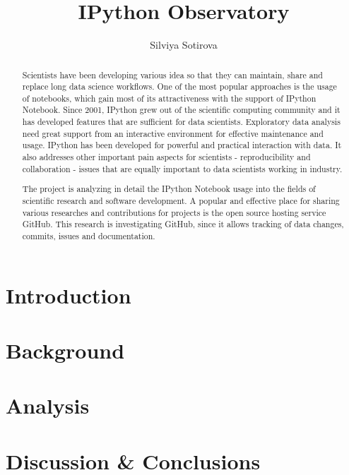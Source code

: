 \documentclass{mpaper}
\begin{document}
\title{IPython Observatory}
\author{Silviya Sotirova}

\maketitle

\begin{abstract}

Scientists have been developing various idea so that they can maintain, share and replace long data science workflows. One of the most popular approaches is the usage of notebooks, which gain most of its attractiveness with the support of IPython Notebook. Since 2001, IPython grew out of the scientific computing community and it has developed features that are sufficient for data scientists. Exploratory data analysis need great support from an interactive environment for effective maintenance and usage. IPython has been developed for powerful and practical interaction with data. It also addresses other important pain aspects for scientists - reproducibility and collaboration - issues that are equally important to data scientists working in industry.

The project is analyzing in detail the IPython Notebook usage into the fields of scientific research and software development. A popular and effective place for sharing various researches and contributions for projects is the open source hosting service GitHub. This research is investigating GitHub, since it allows tracking of data changes, commits, issues and documentation. 

\end{abstract}
\section{Introduction}



\section{Background}


\section{Analysis}


\section{Discussion \& Conclusions}


\vspace{5mm}


\end{document}

